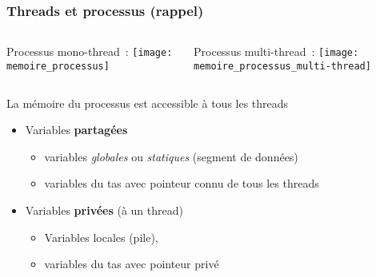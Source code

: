 \documentclass{beamer}
\begin{document}
\begin{frame}
    \frametitle{Threads et processus (rappel)}

    \begin{columns}[t]
      \begin{center}
        Processus mono-thread~:
        \texttt{[image: memoire\_processus]}
      \end{center}
      
      \begin{center}
        Processus multi-thread~:
        \texttt{[image: memoire\_processus\_multi-thread]}
      \end{center}
    \end{columns}

\bigskip 

\begin{block}{La mémoire du processus est accessible à tous les threads}
\begin{itemize}

\item Variables \textbf{\alert{partagées}}
  \begin{itemize}
  \item variables \emph{globales} ou \emph{statiques} (segment de données)
  \item variables du tas avec pointeur connu de tous les threads
  \end{itemize}
  

      
    \item Variables \textbf{\alert{privées}} (à un thread)
      \begin{itemize}
      \item Variables locales (pile),
      \item variables du tas avec pointeur privé
      \end{itemize}
  \end{itemize}
\end{block}
\end{frame}



\newcommand{\itemhappy}{\item[{\raisebox{-4pt}{\texttt{[image: Content]}}}]}
\newcommand{\itemsad}{\item[{\raisebox{-4pt}{\texttt{[image: Triste]}}}]}
\end{document}
